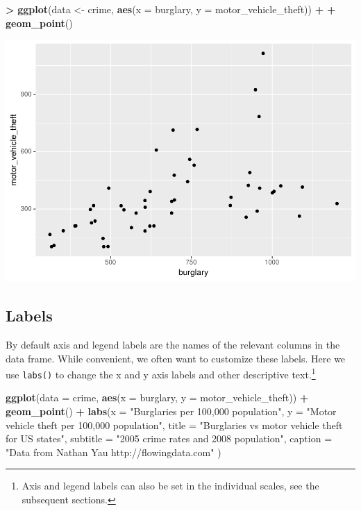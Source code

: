 \documentclass[
]{krantz}
\makeatletter
\newenvironment{Shaded}{\begin{snugshade}}{\end{snugshade}}
\newcommand{\DataTypeTok}[1]{\textcolor[rgb]{0.27,0.27,0.27}{#1}}
\newcommand{\KeywordTok}[1]{\textcolor[rgb]{0.27,0.27,0.27}{\textbf{#1}}}
\newcommand{\NormalTok}[1]{#1}
\newcommand{\OperatorTok}[1]{\textcolor[rgb]{0.43,0.43,0.43}{\textbf{#1}}}
\newcommand{\StringTok}[1]{\textcolor[rgb]{0.5,0.5,0.5}{#1}}
\newenvironment{kframe}{%
\medskip{}
\setlength{\fboxsep}{.8em}
 \def\at@end@of@kframe{}%
 \ifinner\ifhmode%
  \def\at@end@of@kframe{\end{minipage}}%
  \begin{minipage}{\columnwidth}%
 \fi\fi%
 \def\FrameCommand##1{\hskip\@totalleftmargin \hskip-\fboxsep
 \colorbox{shadecolor}{##1}\hskip-\fboxsep
     \hskip-\linewidth \hskip-\@totalleftmargin \hskip\columnwidth}%
 \MakeFramed {\advance\hsize-\width
   \@totalleftmargin\z@ \linewidth\hsize
   \@setminipage}}%
 {\par\unskip\endMakeFramed%
 \at@end@of@kframe}
\renewenvironment{Shaded}{\begin{kframe}}{\end{kframe}}
\makeatother
\begin{document}
\begin{Shaded}
\begin{Highlighting}[]
\OperatorTok{\textgreater{}}\StringTok{ }\KeywordTok{ggplot}\NormalTok{(data \textless{}{-}}\StringTok{ }\NormalTok{crime, }\KeywordTok{aes}\NormalTok{(}\DataTypeTok{x =}\NormalTok{ burglary, }\DataTypeTok{y =}\NormalTok{ motor\_vehicle\_theft)) }\OperatorTok{+}\StringTok{ }
\OperatorTok{+}\StringTok{     }\KeywordTok{geom\_point}\NormalTok{()}
\end{Highlighting}
\end{Shaded}

\includegraphics{bookdown_files/figure-latex/unnamed-chunk-67-1.pdf}

\hypertarget{labels}{%
\subsection{Labels}\label{labels}}

By default axis and legend labels are the names of the relevant columns in the data frame. While convenient, we often want to customize these labels. Here we use \texttt{labs()} to change the x and y axis labels and other descriptive text.\footnote{Axis and legend labels can also be set in the individual scales, see the subsequent sections.}

\begin{Shaded}
\begin{Highlighting}[]
\KeywordTok{ggplot}\NormalTok{(}\DataTypeTok{data =}\NormalTok{ crime, }\KeywordTok{aes}\NormalTok{(}\DataTypeTok{x =}\NormalTok{ burglary, }\DataTypeTok{y =}\NormalTok{ motor\_vehicle\_theft)) }\OperatorTok{+}\StringTok{ }
\StringTok{    }\KeywordTok{geom\_point}\NormalTok{() }\OperatorTok{+}\StringTok{ }
\StringTok{    }\KeywordTok{labs}\NormalTok{(}\DataTypeTok{x =} \StringTok{"Burglaries per 100,000 population"}\NormalTok{, }
         \DataTypeTok{y =} \StringTok{"Motor vehicle theft per 100,000 population"}\NormalTok{,}
         \DataTypeTok{title =} \StringTok{"Burglaries vs motor vehicle theft for US states"}\NormalTok{,}
         \DataTypeTok{subtitle =} \StringTok{"2005 crime rates and 2008 population"}\NormalTok{,}
         \DataTypeTok{caption =} \StringTok{"Data from Nathan Yau http://flowingdata.com"}
\NormalTok{         )}
\end{Highlighting}
\end{Shaded}
\end{document}
